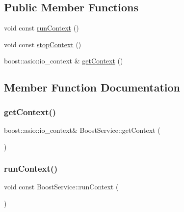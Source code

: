 \subsection*{Public Member Functions}
\begin{DoxyCompactItemize}
\item 
void const \mbox{\hyperlink{classBoostService_a6a8766ff5a3c5ff42c9c114395d50565}{run\+Context}} ()
\item 
void const \mbox{\hyperlink{classBoostService_aff4e11e835ba4961f30f51c7bfa6be6e}{stop\+Context}} ()
\item 
boost\+::asio\+::io\+\_\+context \& \mbox{\hyperlink{classBoostService_ad5fab5bcc9c64c1b2c4b8fcf4b005b1a}{get\+Context}} ()
\end{DoxyCompactItemize}


\subsection{Member Function Documentation}
\mbox{\label{classBoostService_ad5fab5bcc9c64c1b2c4b8fcf4b005b1a}} 
\subsubsection{\texorpdfstring{get\+Context()}{getContext()}}
{\footnotesize\ttfamily boost\+::asio\+::io\+\_\+context\& Boost\+Service\+::get\+Context (\begin{DoxyParamCaption}{ }\end{DoxyParamCaption})\hspace{0.3cm}{\ttfamily [inline]}}

\mbox{\label{classBoostService_a6a8766ff5a3c5ff42c9c114395d50565}} 
\subsubsection{\texorpdfstring{run\+Context()}{runContext()}}
{\footnotesize\ttfamily void const Boost\+Service\+::run\+Context (\begin{DoxyParamCaption}{ }\end{DoxyParamCaption})\hspace{0.3cm}{\ttfamily [inline]}}

